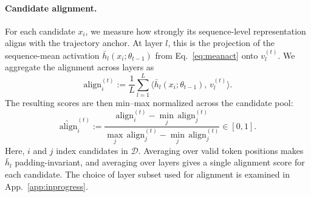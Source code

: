 \paragraph{Candidate alignment.}
For each candidate $x_i$, we measure how strongly its sequence-level
representation aligns with the trajectory anchor. At layer $l$, this
is the projection of the sequence-mean activation
$\bar{h}_l(x_i;\theta_{t-1})$ from Eq.~\ref{eq:meanact} onto
$v_l^{(t)}$. We aggregate the alignment across layers as
\begin{equation}
  \mathrm{align}_i^{(t)}
  :=
  \frac{1}{L}\sum_{l=1}^{L}
  \bigl\langle
    \bar{h}_l(x_i;\theta_{t-1}),\, v_l^{(t)}
  \bigr\rangle .
  \label{eq:align-raw}
\end{equation}
The resulting scores are then min--max normalized across the
candidate pool:
\begin{equation}
  \widetilde{\mathrm{align}}_i^{(t)}
  :=
  \frac{
    \mathrm{align}_i^{(t)}
    -
    \min\limits_{j}\,\mathrm{align}_j^{(t)}
  }{
    \max\limits_{j}\,\mathrm{align}_j^{(t)}
    -
    \min\limits_{j}\,\mathrm{align}_j^{(t)}
  }
  \in [0,1].
  \label{eq:align}
\end{equation}
Here, $i$ and $j$ index candidates in $\mathcal{D}$. Averaging over
valid token positions makes $\bar{h}_l$ padding-invariant, and
averaging over layers gives a single alignment score for each
candidate. The choice of layer subset used for alignment is examined
in App.~\ref{app:inprogress}.


